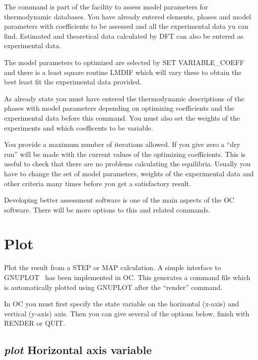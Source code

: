\documentclass[11pt]{article}
\begin{document}
The command is part of the facility to assess model parameters for
thermodynamic databases.  You have already entered elements, phases
and model parameters with coefficients to be assessed and all the
experimental data yu can find.  Estimated and theoretical data
calculated by DFT can also be entered as experimental data.

The model parameters to optimized are selected by SET VARIABLE\_COEFF
and there is a least square routine LMDIF which will vary these to
obtain the best least fit the experimental data provided.

As already state you must have entered the thermodynamic descriptions
of the phases with model parameters depending on optimizing
coefficients and the experimental data before this command.  You must
also set the weights of the experiments and which coefficents to be
variable.

You provide a maximum number of iterations allowed.  If you give zero
a ``dry run'' will be made with the current values of the optimizing
coefficients.  This is useful to check that there are no problems
calculating the equilibria.  Usually you have to change the set of
model parameters, weights of the experimental data and other criteria
many times before you get a satisfactory result.

Developing better assessment software is one of the main aspects of
the OC software.  There will be more options to this and related
commands.

\hypertarget{Plot command}{}
\section{Plot }\label{sc:plot}

Plot the result from a STEP or MAP calculation.  A simple interface to
GNUPLOT~\cite{gnuplot} has been implemented in OC.  This generates a
command file which is automatically plotted using GNUPLOT after the
``render'' command.

In OC you must first specify the state variable on the horizontal
(x-axis) and vertical (y-axis) axis.  Then you can give several of the
options below, finish with RENDER or QUIT.

\hypertarget{Horizontal axis variable}{}
\subsection{{\em plot} Horizontal axis variable}
\end{document}
